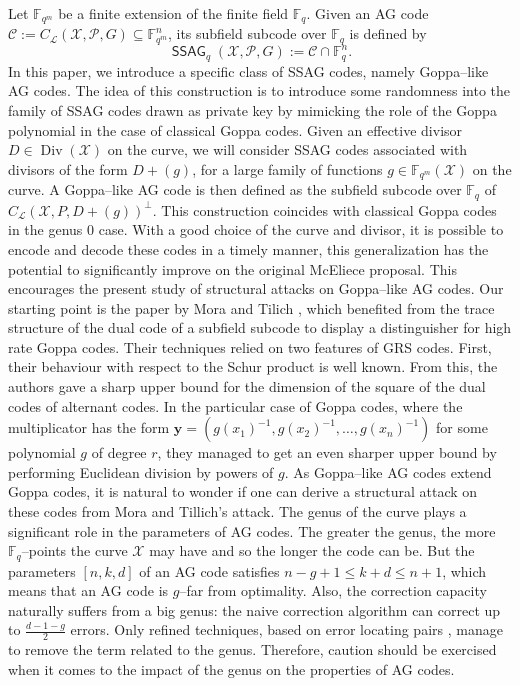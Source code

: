 \documentclass[a4paper]{article}
\theoremstyle{definition}
\theoremstyle{remark}
\newcommand{\calP}{\mathcal{P}}
\newcommand{\calL}{\mathcal{L}}
\newcommand{\calC}{\mathcal{C}}
\newcommand{\calX}{\mathcal{X}}
\newcommand{\fqm}{\mathbb{F}_{q^m}}
\newcommand{\fq}{\mathbb{F}_{q}}
\newcommand{\F}{\mathbb{F}}
\newcommand{\Div}{\operatorname{Div}}
\newcommand{\ssag}[1]{\operatorname{\mathsf{SSAG}}_{q}\left(#1\right)}
\begin{document}
\medskip
Let $\fqm$ be a finite extension of the finite field $\fq$. Given an AG code $\calC :=C_{\calL}(\calX,\calP,G) \subseteq \fqm^n$, its subfield subcode over $\fq$ is defined by 
$$\ssag{\calX,\calP,G} := \calC \cap \fq^n.$$  
In this paper, we introduce a specific class of SSAG codes, namely Goppa--like AG codes. The idea of this construction is to introduce  some randomness into the family of SSAG codes drawn as private key by mimicking the role of the Goppa polynomial in the case of classical Goppa codes. Given an effective divisor $D\in \Div(\calX)$ on the curve, we will consider SSAG codes associated with divisors of the form $D+(g)$, for a large family of functions $g \in \fqm(\calX)$ on the curve. A Goppa--like AG code is then defined as the subfield subcode over $\fq$ of $C_{\calL}(\calX,P,D+(g))^{\perp}$. This construction coincides with classical Goppa codes in the genus 0 case.%
With a good choice of the curve and divisor, it is possible to encode and decode these codes in a timely manner, this generalization has the potential to significantly improve on the original McEliece proposal. This encourages the present study of structural attacks on Goppa--like AG codes. 
Our starting point is the paper by Mora and Tilich \cite{MT21}, which benefited from the trace structure of the dual code of a subfield subcode to display a distinguisher for high rate Goppa codes. Their techniques relied on two features of GRS codes. First, their behaviour with respect to the Schur product is well known. From this, the authors gave a sharp upper bound for the dimension of the square of the dual codes of alternant codes. In the particular case of Goppa codes, where the multiplicator has the form $\mathbf{y}=(g(x_1)^{-1},g(x_2)^{-1},\dots,g(x_n)^{-1})$ for some polynomial $g$ of degree $r$, they managed to get an even sharper upper bound by performing Euclidean division by powers of $g$.
As Goppa--like AG codes extend Goppa codes, it is natural to wonder if one can derive a structural attack on these codes from Mora and Tillich's attack. The genus of the curve plays a significant role in the parameters of AG codes. The greater the genus, the more $\F_q$--points the curve $\calX$ may have and so the longer the code can be. But the parameters $[n,k,d]$ of an AG code satisfies $n-g+1 \leq k+d \leq n+1$, which means that an AG code is $g$--far from optimality. Also, the correction capacity naturally suffers from a big genus: the naive correction algorithm can correct up to $\frac{d-1-g}{2}$ errors. Only refined techniques, based on error locating pairs \cite{CP20}, manage to remove the term related to the genus. Therefore, caution should be exercised when it comes to the impact of the genus on the properties of AG codes.
\end{document}
